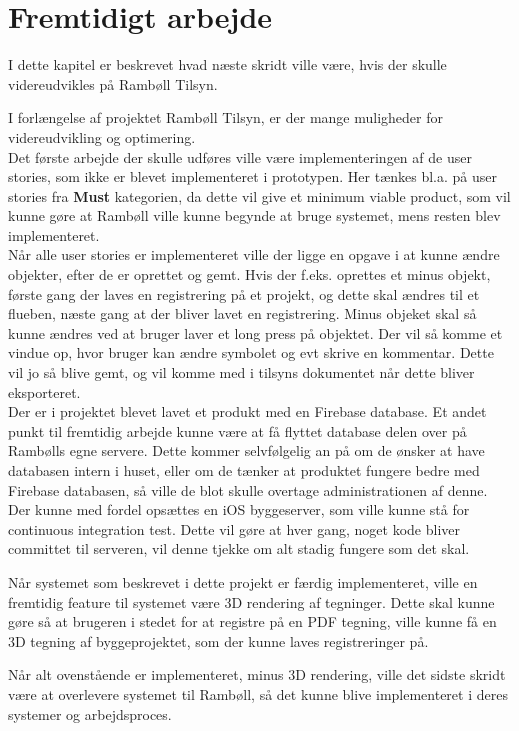 \chapter{Fremtidigt arbejde}
I dette kapitel er beskrevet hvad næste skridt ville være, hvis der skulle videreudvikles på Rambøll Tilsyn.

I forlængelse af projektet Rambøll Tilsyn, er der mange muligheder for videreudvikling og optimering.\\
Det første arbejde der skulle udføres ville være implementeringen af de user stories, som ikke er blevet implementeret i prototypen. Her tænkes bl.a. på user stories fra \textbf{Must} kategorien, da dette vil give et minimum viable product, som vil kunne gøre at Rambøll ville kunne begynde at bruge systemet, mens resten blev implementeret. \\
Når alle user stories er implementeret ville der ligge en opgave i at kunne ændre objekter, efter de er oprettet og gemt. Hvis der f.eks. oprettes et minus objekt, første gang der laves en registrering på et projekt, og dette skal ændres til et flueben, næste gang at der bliver lavet en registrering. Minus objeket skal så kunne ændres ved at bruger laver et long press på objektet. Der vil så komme et vindue op, hvor bruger kan ændre symbolet og evt skrive en kommentar. Dette vil jo så blive gemt, og vil komme med i tilsyns dokumentet når dette bliver eksporteret. \\
Der er i projektet blevet lavet et produkt med en Firebase database. Et andet punkt til fremtidig arbejde kunne være at få flyttet database delen over på Rambølls egne servere. Dette kommer selvfølgelig an på om de ønsker at have databasen intern i huset, eller om de tænker at produktet fungere bedre med Firebase databasen, så ville de blot skulle overtage administrationen af denne. \\
Der kunne med fordel opsættes en iOS byggeserver, som ville kunne stå for continuous integration\cite{CI} test. Dette vil gøre at hver gang, noget kode bliver committet til serveren, vil denne tjekke om alt stadig fungere som det skal.

Når systemet som beskrevet i dette projekt er færdig implementeret, ville en fremtidig feature til systemet være 3D rendering af tegninger. Dette skal kunne gøre så at brugeren i stedet for at registre på en PDF tegning, ville kunne få en 3D tegning af byggeprojektet, som der kunne laves registreringer på.

Når alt ovenstående er implementeret, minus 3D rendering, ville det sidste skridt være at overlevere systemet til Rambøll, så det kunne blive implementeret i deres systemer og arbejdsproces.